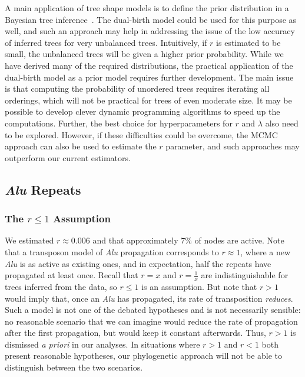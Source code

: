 A main application of tree shape models is to define the prior distribution in a Bayesian tree inference~\cite{Drummond2007,Mooers2012}. The dual-birth model could be used for this purpose as well, and such an approach may help in addressing the issue of the low accuracy of inferred trees for very unbalanced trees. Intuitively, if $r$ is estimated to be small, the unbalanced trees will be given a higher prior probability. While we have derived many of the required distributions, the practical application of the dual-birth model as a prior model requires further development. The main issue is that computing the probability of unordered trees requires iterating all orderings, which will not be practical for trees of even moderate size. It may be possible to develop clever dynamic programming algorithms to speed up the computations. Further, the best choice for hyperparameters for $r$ and $\lambda$ also need to be explored. However, if these difficulties could be overcome, the \gls{MCMC} approach can also be used to estimate the $r$ parameter, and such approaches may outperform our current estimators.

\subsection{\textit{Alu} Repeats}
\subsubsection{The $r\leq1$ Assumption}
We estimated $r\approx0.006$ and that approximately 7\% of nodes are active. Note that a transposon model of \textit{Alu} propagation corresponds to $r\approx1$, where a new \textit{Alu} is as active as existing ones, and in expectation, half the repeats have propagated at least once. Recall that $r=x$ and $r=\frac{1}{x}$  are indistinguishable for trees inferred from the data, so $r\leq 1$ is an assumption. But note that $r>1$ would imply that, once an \textit{Alu} has propagated, its rate of transposition \textit{reduces}. Such a model is not one of the debated hypotheses and is not necessarily sensible: no reasonable scenario that we can imagine would reduce the rate of propagation after the first propagation, but would keep it constant afterwards. Thus, $r>1$ is dismissed \textit{a priori} in our analyses. In situations where $r>1$ and $r<1$ both present reasonable hypotheses, our phylogenetic approach will not be able to distinguish between the two scenarios.


